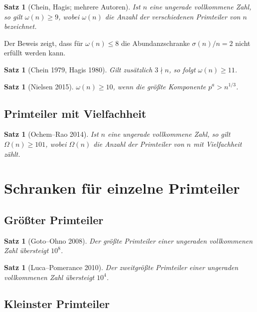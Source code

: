 \documentclass[12pt,a4paper]{amsart}
\newtheorem{satz}[theorem]{Satz}
\theoremstyle{definition}
\theoremstyle{remark}
\begin{document}
\begin{satz}[Chein, Hagis; mehrere Autoren]
\label{satz:omega}
Ist $n$ eine ungerade vollkommene Zahl, so gilt $\omega(n) \geq 9$,
wobei $\omega(n)$ die Anzahl der verschiedenen Primteiler von $n$ bezeichnet.
\end{satz}

Der Beweis zeigt, dass für $\omega(n) \leq 8$ die Abundanzschranke
$\sigma(n)/n = 2$ nicht erfüllt werden kann.

\begin{satz}[Chein 1979, Hagis 1980]
Gilt zusätzlich $3 \nmid n$, so folgt $\omega(n) \geq 11$.
\end{satz}

\begin{satz}[Nielsen 2015]
$\omega(n) \geq 10$, wenn die größte Komponente $p^a > n^{1/3}$.
\end{satz}

\subsection{Primteiler mit Vielfachheit}

\begin{satz}[Ochem--Rao 2014]
Ist $n$ eine ungerade vollkommene Zahl, so gilt $\Omega(n) \geq 101$,
wobei $\Omega(n)$ die Anzahl der Primteiler von $n$ mit Vielfachheit zählt.
\end{satz}

\section{Schranken für einzelne Primteiler}

\subsection{Größter Primteiler}

\begin{satz}[Goto--Ohno 2008]
Der größte Primteiler einer ungeraden vollkommenen Zahl übersteigt $10^8$.
\end{satz}

\begin{satz}[Luca--Pomerance 2010]
Der zweitgrößte Primteiler einer ungeraden vollkommenen Zahl übersteigt $10^4$.
\end{satz}

\subsection{Kleinster Primteiler}
\end{document}
